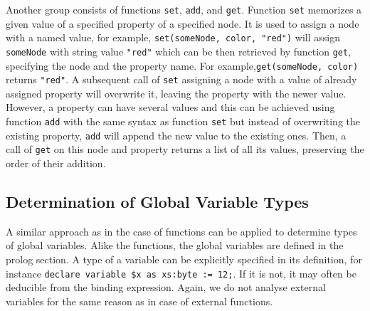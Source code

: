 Another group consists of functions \texttt{set}, \texttt{add}, and \texttt{get}. Function \texttt{set} memorizes a given value of a specified property of a specified node. It is used to assign a node with a named value, for example, \texttt{set(someNode, color, "red")} will assign \texttt{someNode} with string value \texttt{"red"} which can be then retrieved by function \texttt{get}, specifying the node and the property name. For example,\linebreak \texttt{get(someNode, color)} returns \texttt{"red"}. A subsequent call of \texttt{set} assigning a node with a value of already assigned property will overwrite it, leaving the property with the newer value. However, a property can have several values and this can be achieved using function \texttt{add} with the same syntax as function \texttt{set} but instead of overwriting the existing property, \texttt{add} will append the new value to the existing ones. Then, a call of \texttt{get} on this node and property returns a list of all its values, preserving the order of their addition.

\subsection{Determination of Global Variable Types}
A similar approach as in the case of functions can be applied to determine types of global variables. Alike the functions, the global variables are defined in the prolog section. A type of a variable can be explicitly specified in its definition, for instance \texttt{declare variable \$x as xs:byte := 12;}. If it is not, it may often be deducible from the binding expression. Again, we do not analyse external variables for the same reason as in case of external functions.

